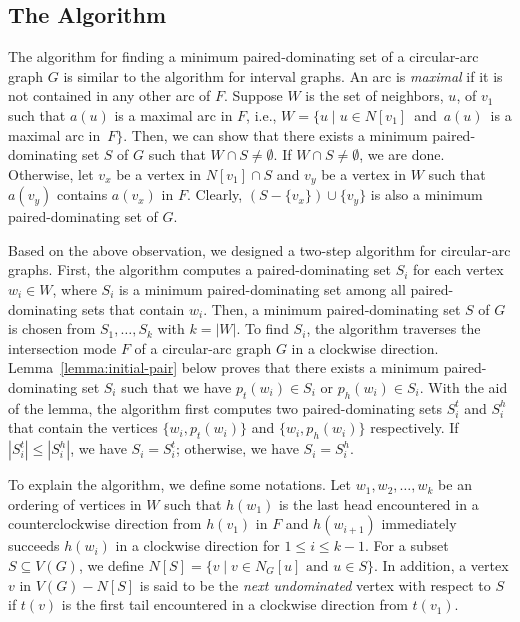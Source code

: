 \documentclass[12pt]{article}
\newcommand{\setof}[1]{\{{#1}\}}
\begin{document}
\subsection{The Algorithm
                              \label{section:outline-algo-arc}}
The algorithm for finding a minimum paired-dominating set of a
circular-arc graph $G$ is similar to the algorithm for interval graphs. An arc is {\em maximal} if it is not contained in any other arc of $F$. Suppose $W$ is the set of neighbors, $u$, of $v_1$ such that $a(u)$ is a maximal arc in $F$, i.e., $W = \{u \mid u \in N[v_1] $~and~$ a(u) $~is a maximal arc in~$ F\}$. Then, we can show that there exists a minimum paired-dominating set $S$ of $G$ such that $W \cap S \not = \emptyset$. If $W \cap S \not =
\emptyset$, we are done. Otherwise, let $v_x$ be a vertex in
$N[v_1] \cap S$ and $v_y$ be a vertex in $W$ such that $a(v_y)$
contains $a(v_x)$ in $F$. Clearly, $(S-\setof{v_x})\cup\setof{v_y}$ is also a minimum paired-dominating set of $G$.

Based on the above observation, we designed a two-step algorithm
for circular-arc graphs. First, the algorithm computes a paired-dominating set $S_i$ for each vertex $w_i \in W$, where $S_i$ is a minimum paired-dominating set among all paired-dominating sets that contain $w_i$. Then, a minimum paired-dominating set $S$ of $G$ is chosen from $S_1,\ldots,S_k$ with $k = |W|$. To find $S_i$, the
algorithm traverses the intersection mode $F$ of a circular-arc
graph $G$ in a clockwise direction. Lemma~\ref{lemma:initial-pair} below proves that there exists a minimum
paired-dominating set $S_i$ such that we have $p_t(w_i) \in
S_i$ or $p_h(w_i) \in S_i$. With the aid of the lemma, the
algorithm first computes two paired-dominating sets $S_i^t$ and
$S_i^h$ that contain the vertices $\setof{w_i, p_t(w_i)}$ and
$\setof{w_i, p_h(w_i)}$ respectively. If $|S_i^t| \le |S_i^h|$,
we have $S_i = S_i^t$; otherwise, we have $S_i = S_i^h$.

To explain the algorithm, we define some notations.
Let $w_1, w_2,\ldots, w_k$ be an ordering of vertices in $W$ such
that $h(w_1)$ is the last head encountered in a counterclockwise
direction from $h(v_1)$ in $F$ and $h(w_{i+1})$
immediately succeeds $h(w_{i})$ in a clockwise direction for $1\le
i \le k-1$. For a subset $S \subseteq V(G)$, we define $N[S] =
\setof{v \mid v \in N_G[u] \text{ and } u\in S}$. In addition, a
vertex $v$ in $V(G)-N[S]$ is said to be the {\em next undominated}
vertex with respect to $S$ if $t(v)$ is the first tail encountered
in a clockwise direction from $t(v_1)$.
\end{document}
